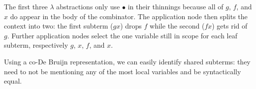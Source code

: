 \codebruijnexamplegraph{}

The first three $\lambda$ abstractions only use $\bullet$ in their thinnings
because all of $g$, $f$, and $x$ do appear in the body of the combinator.
%
The application node then splits the context into two: the first subterm
($g x$) drops $f$ while the second ($f x$) gets rid of $g$.
%
Further application nodes select the one variable still in scope for each
leaf subterm, respectively $g$, $x$, $f$, and $x$.


Using a co-De Bruijn representation, we can easily identify shared subterms:
they need to not be mentioning any of the most local variables and be
syntactically equal.
